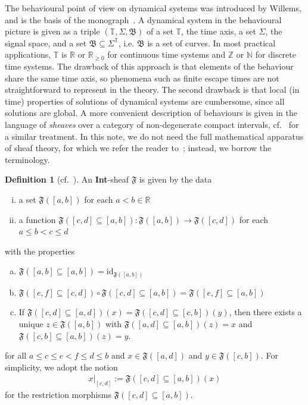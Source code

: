 \documentclass[preprint,12pt]{elsarticle}
\theoremstyle{definition}
\newtheorem{definition}[theorem]{Definition}
\begin{document}
The behavioural point of view on dynamical systems was introduced by Willems, and is the basis of the monograph~\cite{Polderman}. A dynamical system in the behavioural picture is given as a triple $(\mathbb{T},\Sigma,\mathfrak{B})$ of a set $\mathbb{T}$, the time axis, a set $\Sigma$, the signal space, and a set $\mathfrak{B}\subseteq\Sigma^\mathbb{T}$, i.e. $\mathfrak{B}$ is a set of curves. In most practical applications, $\mathbb{T}$ is $\mathbb{R}$ or $\mathbb{R}_{\geq 0}$ for continuous time systems and $\mathbb{Z}$ or $\mathbb{N}$  for discrete time systems. The drawback of this approach is that elements of the behaviour share the same time axis, so phenomena such as finite escape times are not straightforward to represent in the theory. The second drawback is that local (in time) properties of solutions of dynamical systems are cumbersome, since all solutions are global. A more convenient description of behaviours is given in the language of \textit{sheaves} over a category of non-degenerate compact intervals, cf.~\cite{SchuSPivVasi20} for a similar treatment. In this note, we do not need the full mathematical apparatus of sheaf theory, for which we refer the reader to~\cite{Bred97,John02,MaLaMoer92}; instead, we borrow the terminology.

\begin{definition}[cf.~\cite{Bock26}]
An \textbf{Int}-sheaf $\mathfrak{F}$ is given by the data
\begin{enumerate}[(i)]
\item a set $\mathfrak{F}([a,b])$ for each $a<b\in\mathbb{R}$
\item a function $\mathfrak{F}([c,d]\subseteq[a,b]):\mathfrak{F}([a,b])\to\mathfrak{F}([c,d])$ for each $a\leq b<c\leq d$ 
\end{enumerate}
with the properties
\begin{enumerate}[(a)]
\item $\mathfrak{F}([a,b]\subseteq[a,b]) = \mathrm{id}_{\mathfrak{F}([a,b])}$
\item $\mathfrak{F}([e,f]\subseteq[c,d])\circ \mathfrak{F}([c,d]\subseteq[a,b]) = \mathfrak{F}([e,f]\subseteq[a,b])$
\item If $\mathfrak{F}([c,d]\subseteq[a,d])(x) = \mathfrak{F}([c,d]\subseteq[c,b])(y)$, then there exists a unique $z\in\mathfrak{F}([a,b])$ with $\mathfrak{F}([a,d]\subseteq [a,b])(z) = x$ and $\mathfrak{F}([c,b]\subseteq[a,b])(z) = y$.
\end{enumerate}
for all $a\leq c\leq e<f\leq d\leq b$ and $x\in\mathfrak{F}([a,d])$ and $y\in\mathfrak{F}([c,b])$. For simplicity, we adopt the notion
\begin{align*}
x\vert_{[c,d]} := \mathfrak{F}([c,d]\subseteq[a,b])(x)
\end{align*}
for the restriction morphisms $\mathfrak{F}([c,d]\subseteq[a,b])$.
\end{definition}
\end{document}
